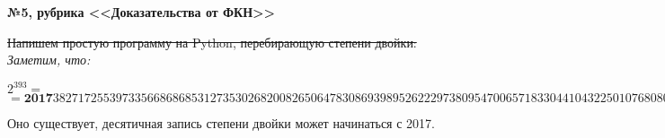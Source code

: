 \documentclass{article}
\newenvironment{task}{\begin{center}\fontsize{14}{14}\selectfont\bf}{\rm\fontsize{12}{12}\selectfont\end{center}}
\begin{document}
	
	
	\begin{task} 
		№5, рубрика <<Доказательства от ФКН>>
	\end{task}
	\sout{Напишем простую программу на Python, перебирающую степени двойки:} 
	\textit{Заметим, что:}
	\begin{center}
		\fontsize{8.5}{8.5}\selectfont
		$2^{393} = $ \\ $=
		\textbf{2017}3827172553973356686868531273530268200826506478308693989526222973809547006571833044104322501076808092993531037089792$
	\end{center}
	Оно существует, десятичная запись степени двойки может начинаться с 2017.
	
	
	
	
	
	
	
\end{document}
